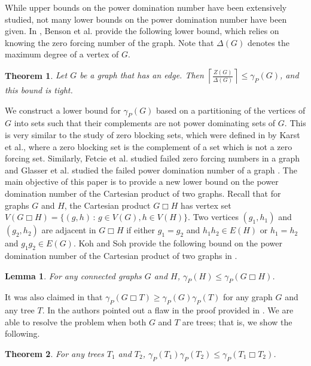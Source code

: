 \documentclass[11pt]{article}
\newtheorem{theorem}{Theorem}
\newtheorem{lemma}{Lemma}
\begin{document}
While upper bounds on the power domination number have been extensively studied, not many lower bounds on the power domination number have been given. In \cite{KBDF}, Benson et al. provide the following lower bound, which relies on knowing the zero forcing number of the graph. Note that $\Delta(G)$ denotes the maximum degree of a vertex of $G$.

\begin{theorem} \cite{KBDF}
Let $G$ be a graph that has an edge. Then $\left \lceil \frac{Z(G)}{\Delta(G)} \right \rceil \leq \gamma_P(G)$, and this bound is tight.
\end{theorem}

We construct a lower bound for $\gamma_P(G)$ based on a partitioning of the vertices of $G$ into sets such that their complements are not power dominating sets of $G$. This is very similar to the study of zero blocking sets, which were defined in \cite{KSTV-2020} by Karst et al., where a zero blocking set is the complement of a set which is not a zero forcing set. Similarly, Fetcie et al. studied failed zero forcing numbers in a graph \cite{FJS15} and Glasser et al. studied the failed power domination number of a graph \cite{GJLR-2020}. The main objective of this paper is to provide a new lower bound on the power domination number of the Cartesian product of two graphs. Recall that for graphs $G$ and $H$, the Cartesian product $G\Box H$ has vertex set
$V(G \Box H) = \{(g,h)\,:\, g\in V(G), h \in V(H)\}$.  Two vertices $(g_1,h_1)$ and $(g_2,h_2)$ are adjacent in $G\Box H$ if either $g_1=g_2$ and $h_1h_2\in E(H)$ or $h_1=h_2$ and $g_1g_2 \in E(G)$. Koh and Soh provide the following bound on the power domination number of the Cartesian product of two graphs in \cite{pdprod}. 

\begin{lemma}\cite{pdprod}\label{thm:Cartlower} For any connected graphs $G$ and $H$, $\gamma_P(H) \leq \gamma_P(G\Box H)$.
\end{lemma}

It was also claimed in \cite{pdprod} that $\gamma_P(G\Box T) \ge \gamma_P(G)\gamma_P(T)$ for any graph $G$ and any tree $T$. In \cite{pdcubic} the authors pointed out a flaw in the proof provided in \cite{pdprod}. We are able to resolve the problem when both $G$ and $T$ are trees; that is, we show the following. 

\begin{theorem} For any trees $T_1$ and $T_2$, $\gamma_P(T_1)\gamma_P(T_2) \leq \gamma_P(T_1 \Box T_2)$.
\label{cartlowerboundtree}
\end{theorem}
\end{document}
